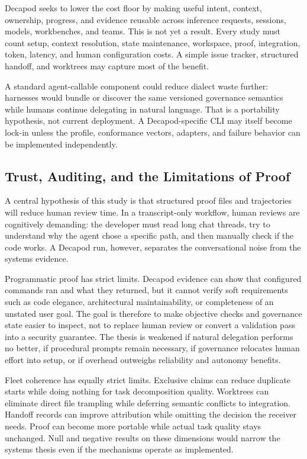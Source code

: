 Decapod seeks to lower the cost floor by making useful intent, context, ownership, progress, and evidence reusable across inference requests, sessions, models, workbenches, and teams. This is not yet a result. Every study must count setup, context resolution, state maintenance, workspace, proof, integration, token, latency, and human configuration costs. A simple issue tracker, structured handoff, and worktrees may capture most of the benefit.

A standard agent-callable component could reduce dialect waste further: harnesses would bundle or discover the same versioned governance semantics while humans continue delegating in natural language. That is a portability hypothesis, not current deployment. A Decapod-specific CLI may itself become lock-in unless the profile, conformance vectors, adapters, and failure behavior can be implemented independently.

\subsection{Trust, Auditing, and the Limitations of Proof}
A central hypothesis of this study is that structured proof files and trajectories will reduce human review time. In a transcript-only workflow, human reviews are cognitively demanding: the developer must read long chat threads, try to understand why the agent chose a specific path, and then manually check if the code works. A Decapod run, however, separates the conversational noise from the systems evidence.

Programmatic proof has strict limits. Decapod evidence can show that configured commands ran and what they returned, but it cannot verify soft requirements such as code elegance, architectural maintainability, or completeness of an unstated user goal. The goal is therefore to make objective checks and governance state easier to inspect, not to replace human review or convert a validation pass into a security guarantee. The thesis is weakened if natural delegation performs no better, if procedural prompts remain necessary, if governance relocates human effort into setup, or if overhead outweighs reliability and autonomy benefits.

Fleet coherence has equally strict limits. Exclusive claims can reduce duplicate starts while doing nothing for task decomposition quality. Worktrees can eliminate direct file trampling while deferring semantic conflicts to integration. Handoff records can improve attribution while omitting the decision the receiver needs. Proof can become more portable while actual task quality stays unchanged. Null and negative results on these dimensions would narrow the systems thesis even if the mechanisms operate as implemented.
